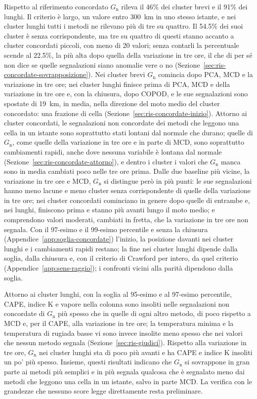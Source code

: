Rispetto al riferimento concordato $G_{\mathrm{n}}$ rileva il 46\% dei cluster brevi e il 91\% dei lunghi. Il criterio è largo, un valore entro 300~km in uno stesso istante, e nei cluster lunghi tutti i metodi ne rilevano più di tre su quattro. Il 54.5\% dei suoi cluster è senza corrispondente, ma tre su quattro di questi stanno accanto a cluster concordati piccoli, con meno di 20 valori; senza contarli la percentuale scende al 22.5\%, la più alta dopo quella della variazione in tre ore, il che di per sé non dice se quelle segnalazioni siano anomalie vere o no (Sezione~\ref{sec:ris-concordate-sovrapposizione}). Nei cluster brevi $G_{\mathrm{n}}$ comincia dopo PCA, MCD e la variazione in tre ore; nei cluster lunghi finisce prima di PCA, MCD e della variazione in tre ore e, con la chiusura, dopo COPOD, e le sue segnalazioni sono spostate di 19~km, in media, nella direzione del moto medio del cluster concordato: una frazione di cella (Sezione~\ref{sec:ris-concordate-inizio}). Attorno ai cluster concordati, le segnalazioni non concordate dei metodi che leggono una cella in un istante sono soprattutto stati lontani dal normale che durano; quelle di $G_{\mathrm{n}}$, come quelle della variazione in tre ore e in parte di MCD, sono soprattutto cambiamenti rapidi, anche dove nessuna variabile è lontana dal normale (Sezione~\ref{sec:ris-concordate-attorno}), e dentro i cluster i valori che $G_{\mathrm{n}}$ manca sono in media cambiati poco nelle tre ore prima. Dalle due baseline più vicine, la variazione in tre ore e MCD, $G_{\mathrm{n}}$ si distingue però in più punti: le sue segnalazioni hanno meno lacune e meno cluster senza corrispondente di quelle della variazione in tre ore; nei cluster concordati cominciano in genere dopo quelle di entrambe e, nei lunghi, finiscono prima e stanno più avanti lungo il moto medio; e comprendono valori moderati, cambiati in fretta, che la variazione in tre ore non segnala. Con il 97-esimo e il 99-esimo percentile e senza la chiusura (Appendice~\ref{app:soglia-concordate}) l'inizio, la posizione davanti nei cluster lunghi e i cambiamenti rapidi restano; la fine nei cluster lunghi dipende dalla soglia, dalla chiusura e, con il criterio di Crawford per intero, da quel criterio (Appendice~\ref{app:sens-raggio}); i confronti vicini alla parità dipendono dalla soglia.

Attorno ai cluster lunghi, con la soglia al 95-esimo e al 97-esimo percentile, CAPE, indice K e vapore nella colonna sono insoliti nelle segnalazioni non concordate di $G_{\mathrm{n}}$ più spesso che in quelle di ogni altro metodo, di poco rispetto a MCD e, per il CAPE, alla variazione in tre ore; la temperatura minima e la temperatura di rugiada basse vi sono invece insolite meno spesso che nei valori che nessun metodo segnala (Sezione~\ref{sec:ris-giudici}). Rispetto alla variazione in tre ore, $G_{\mathrm{n}}$ nei cluster lunghi sta di poco più avanti e ha CAPE e indice K insoliti un po' più spesso. Insieme, questi risultati indicano che $G_{\mathrm{n}}$ si sovrappone in gran parte ai metodi più semplici e in più segnala qualcosa che è segnalato meno dai metodi che leggono una cella in un istante, salvo in parte MCD. La verifica con le grandezze che nessuno score legge direttamente resta preliminare.

